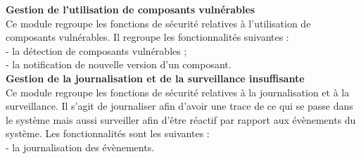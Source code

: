 

\textbf{\RIGHTarrow Gestion de l'utilisation de composants vulnérables}\\
Ce module regroupe les fonctions de sécurité relatives à l'utilisation de composants vulnérables. Il regroupe les fonctionnalités suivantes : \\
- la détection de composants vulnérables ; \\
- la notification de nouvelle version d'un composant.\\

\textbf{\RIGHTarrow Gestion de la journalisation et de la surveillance insuffisante}\\
Ce module regroupe les fonctions de sécurité relatives à la journalisation et à la surveillance. Il s'agit de journaliser afin d'avoir une trace de ce qui se passe dans le système mais aussi surveiller afin d'être réactif par rapport aux évènements du système. Les fonctionnalités sont les suivantes :\\
- la journalisation des évènements. \\


